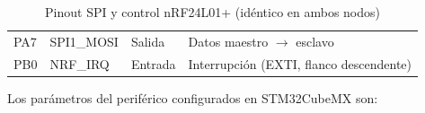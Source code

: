 \documentclass[12pt,a4paper]{article}
\begin{document}
\begin{table}[h]
\begin{tabular}{llll}
  PA7 & SPI1\_MOSI & Salida & Datos maestro $\rightarrow$ esclavo \\                                                                                                                                                                                          
  PB0 & NRF\_IRQ   & Entrada & Interrupción (EXTI, flanco descendente) \\                                                                                                                                                                                     
  \hline                                                                                                                                                                                                                                                      
  \end{tabular}                                                                                                                                                                                                                                               
  \caption{Pinout SPI y control nRF24L01+ (idéntico en ambos nodos)}                                                                                                                                                                                          
  \end{table}                                                                                                                                                                                                                                                 
  
  Los parámetros del periférico configurados en STM32CubeMX son:                                                                                                                                                                                              
  
\end{document}
